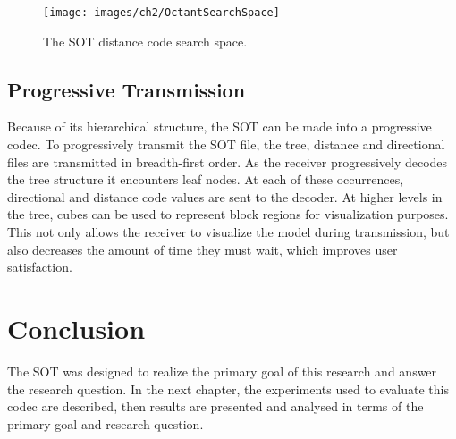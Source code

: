 \begin{figure}[!h]
\centering
\texttt{[image: images/ch2/OctantSearchSpace]}
\caption{The SOT distance code search space.}
\label{OctantSearchSpace}
\end{figure}

\subsection{Progressive Transmission}

Because of its hierarchical structure, the SOT can be made into a progressive codec. To progressively transmit the SOT file, the tree, distance and directional files are transmitted in breadth-first order. As the receiver progressively decodes the tree structure it encounters leaf nodes. At each of these occurrences, directional and distance code values are sent to the decoder. At higher levels in the tree, cubes can be used to represent block regions for visualization purposes.
This not only allows the receiver to visualize the model during transmission, but also decreases the amount of time they must wait, which improves user satisfaction.



\section{Conclusion}

The SOT was designed to realize the primary goal of this research and answer the research question. In the next chapter, the experiments used to evaluate this codec are described, then results are presented and analysed in terms of the primary goal and research question.

